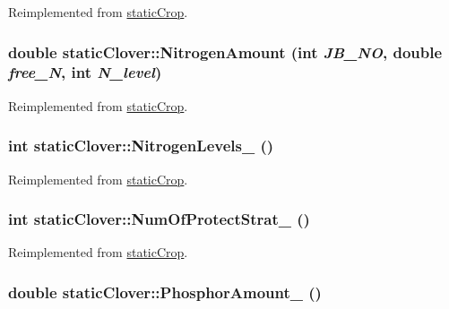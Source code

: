 Reimplemented from \hyperlink{classstatic_crop_a9b67ef1ae531a3afb32b63a4aeb5916b}{staticCrop}.\hypertarget{classstatic_clover_ae9dc15ee27633df963bc99fe8f3a0ec9}{
\subsubsection[{NitrogenAmount}]{\setlength{\rightskip}{0pt plus 5cm}double staticClover::NitrogenAmount (int {\em JB\_\-NO}, \/  double {\em free\_\-N}, \/  int {\em N\_\-level})}}
\label{classstatic_clover_ae9dc15ee27633df963bc99fe8f3a0ec9}


Reimplemented from \hyperlink{classstatic_crop_af3aa85321a8a75406f8a0751b71587d0}{staticCrop}.\hypertarget{classstatic_clover_a50bfb95def66e3d974d8096e64851a94}{
\subsubsection[{NitrogenLevels\_\-}]{\setlength{\rightskip}{0pt plus 5cm}int staticClover::NitrogenLevels\_\- ()}}
\label{classstatic_clover_a50bfb95def66e3d974d8096e64851a94}


Reimplemented from \hyperlink{classstatic_crop_a32b69ed138beaed150efa74d18e82d8e}{staticCrop}.\hypertarget{classstatic_clover_a23f68f39a4766a3cb79ef780545f7fc2}{
\subsubsection[{NumOfProtectStrat\_\-}]{\setlength{\rightskip}{0pt plus 5cm}int staticClover::NumOfProtectStrat\_\- ()}}
\label{classstatic_clover_a23f68f39a4766a3cb79ef780545f7fc2}


Reimplemented from \hyperlink{classstatic_crop_a4d3d767f569f48eb68ffa76822302467}{staticCrop}.\hypertarget{classstatic_clover_ac88cfc779dbd01681bc3f5a86195a8fe}{
\subsubsection[{PhosphorAmount\_\-}]{\setlength{\rightskip}{0pt plus 5cm}double staticClover::PhosphorAmount\_\- ()}}
\label{classstatic_clover_ac88cfc779dbd01681bc3f5a86195a8fe}


